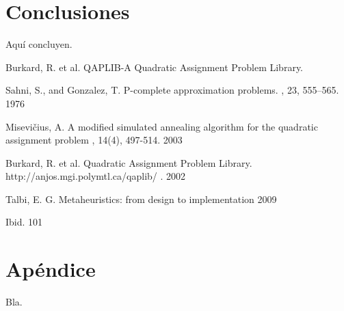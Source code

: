 \documentclass{ci5652}
\begin{document}
\section*{Conclusiones}

Aquí concluyen.


\small


\begin{thebibliography}{99}

Burkard, R. et al.
\newblock QAPLIB-A Quadratic Assignment Problem Library.

Sahni, S., and Gonzalez, T.
\newblock P-complete approximation problems.
, 23, 555–565. 1976

Misevičius, A.
\newblock A modified simulated annealing algorithm for the quadratic assignment problem
, 14(4), 497-514. 2003

Burkard, R. et al.
\newblock Quadratic Assignment Problem Library.
\newblock http://anjos.mgi.polymtl.ca/qaplib/ . 2002

Talbi, E. G. 
\newblock Metaheuristics: from design to implementation
 2009

Ibid. 101





\end{thebibliography}


\newpage
\section*{Apéndice}

Bla.
\end{document}
